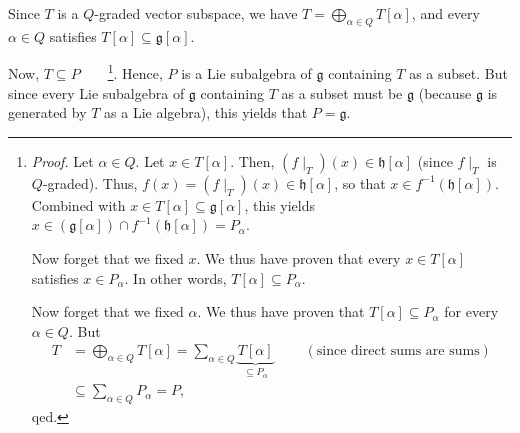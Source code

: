 \documentclass[etingof-lie.tex]{subfiles}
\begin{document}
\begin{verlong}
Since $T$ is a $Q$-graded vector subspace, we have $T=\bigoplus\limits_{\alpha
\in Q}T\left[  \alpha\right]  $, and every $\alpha\in Q$ satisfies $T\left[
\alpha\right]  \subseteq\mathfrak{g}\left[  \alpha\right]  $.

Now, $T\subseteq P$\ \ \ \ \footnote{\textit{Proof.} Let $\alpha\in Q$. Let
$x\in T\left[  \alpha\right]  $. Then, $\left(  f\mid_{T}\right)  \left(
x\right)  \in\mathfrak{h}\left[  \alpha\right]  $ (since $f\mid_{T}$ is
$Q$-graded). Thus, $f\left(  x\right)  =\left(  f\mid_{T}\right)  \left(
x\right)  \in\mathfrak{h}\left[  \alpha\right]  $, so that $x\in f^{-1}\left(
\mathfrak{h}\left[  \alpha\right]  \right)  $. Combined with $x\in T\left[
\alpha\right]  \subseteq\mathfrak{g}\left[  \alpha\right]  $, this yields
$x\in\left(  \mathfrak{g}\left[  \alpha\right]  \right)  \cap f^{-1}\left(
\mathfrak{h}\left[  \alpha\right]  \right)  =P_{\alpha}$.
\par
Now forget that we fixed $x$. We thus have proven that every $x\in T\left[
\alpha\right]  $ satisfies $x\in P_{\alpha}$. In other words, $T\left[
\alpha\right]  \subseteq P_{\alpha}$.
\par
Now forget that we fixed $\alpha$. We thus have proven that $T\left[
\alpha\right]  \subseteq P_{\alpha}$ for every $\alpha\in Q$. But
\begin{align*}
T  &  =\bigoplus\limits_{\alpha\in Q}T\left[  \alpha\right]  =\sum
\limits_{\alpha\in Q}\underbrace{T\left[  \alpha\right]  }_{\subseteq
P_{\alpha}}\ \ \ \ \ \ \ \ \ \ \left(  \text{since direct sums are
sums}\right) \\
&  \subseteq\sum\limits_{\alpha\in Q}P_{\alpha}=P,
\end{align*}
qed.}. Hence, $P$ is a Lie subalgebra of $\mathfrak{g}$ containing $T$ as a
subset. But since every Lie subalgebra of $\mathfrak{g}$ containing $T$ as a
subset must be $\mathfrak{g}$ (because $\mathfrak{g}$ is generated by $T$ as a
Lie algebra), this yields that $P=\mathfrak{g}$.


\end{verlong}
\end{document}
